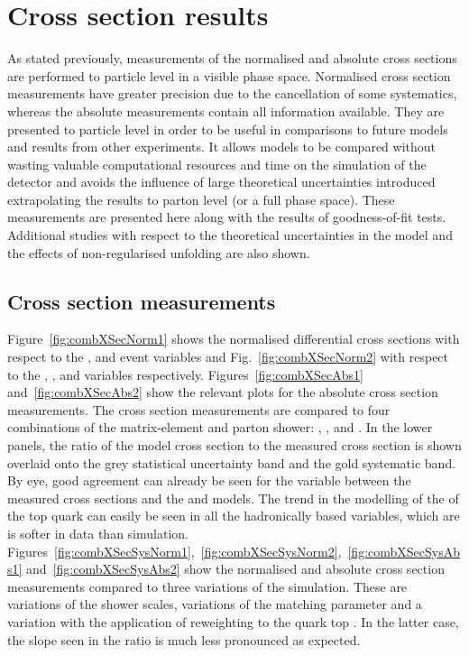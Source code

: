 \chapter{Cross section results}
\label{ch:xsection}

As stated previously, measurements of the normalised and absolute cross sections are performed to particle level in a visible phase space.
Normalised cross section measurements have greater precision due to the cancellation of some systematics, whereas the absolute measurements contain all information available.
They are presented to particle level in order to be useful in comparisons to future models and results from other experiments.
It allows models to be compared without wasting valuable computational resources and time on the simulation of the detector and avoids the influence of large theoretical uncertainties introduced extrapolating the results to parton level (or a full phase space). 
These measurements are presented here along with the results of \chisq{} goodness-of-fit tests.
Additional studies with respect to the theoretical uncertainties in the \ttbar{} model and the effects of non-regularised unfolding are also shown.

\section{Cross section measurements} %
\label{sec:cross_section_measurements}

Figure~\ref{fig:combXSecNorm1} shows the normalised differential cross sections with respect to the \NJET{}, \HT{} and \ST{} event variables and Fig.~\ref{fig:combXSecNorm2} with respect to the \ptmiss{}, \WPT{}, \LPT{} and \LETA{} variables respectively.
Figures~\ref{fig:combXSecAbs1} and~\ref{fig:combXSecAbs2} show the relevant plots for the absolute cross section measurements.
The cross section measurements are compared to four combinations of the matrix-element and parton shower: \powhegpythia{}, \powhegherwig{}, \mgamcFxFxpythia{} and \mgamcMLMpythia{}.
In the lower panels, the ratio of the model cross section to the measured cross section is shown overlaid onto the grey statistical uncertainty band and the gold systematic band.
By eye, good agreement can already be seen for the \NJET{} variable between the measured cross sections and the \powhegpythia{} and \mgamcFxFxpythia{} models.
The trend in the modelling of the \pt{} of the top quark can easily be seen in all the hadronically based variables, which are is softer in data than simulation.
Figures~\ref{fig:combXSecSysNorm1},~\ref{fig:combXSecSysNorm2},~\ref{fig:combXSecSysAbs1} and~\ref{fig:combXSecSysAbs2} show the normalised and absolute cross section measurements compared to three variations of the \powhegpythia{} simulation.
These are variations of the shower scales, variations of the \hdamp{} matching parameter and a variation with the application of reweighting to the quark top \pt{}.
In the latter case, the slope seen in the ratio is much less pronounced as expected.

